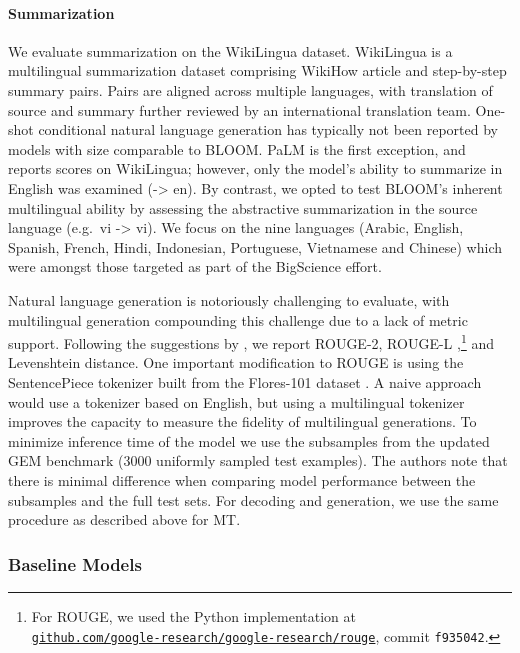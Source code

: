 \paragraph{Summarization} We evaluate summarization on the WikiLingua \citep{ladhak-etal-2020-wikilingua} dataset. WikiLingua is a multilingual summarization dataset comprising WikiHow article and step-by-step summary pairs. Pairs are aligned across multiple languages, with translation of source and summary further reviewed by an international translation team. One-shot conditional natural language generation has typically not been reported by models with size comparable to BLOOM. PaLM \citep{chowdhery2022palm} is the first exception, and reports scores on WikiLingua; however, only the model's ability to summarize in English was examined (-> en). By contrast, we opted to test BLOOM's inherent multilingual ability by assessing the abstractive summarization in the source language (e.g.~vi -> vi). We focus on the nine languages (Arabic, English, Spanish, French, Hindi, Indonesian, Portuguese, Vietnamese and Chinese) which were amongst those targeted as part of the BigScience effort. 

Natural language generation is notoriously challenging to evaluate, with multilingual generation compounding this challenge due to a lack of metric support. Following the suggestions by \citet{gehrmann_cracked}, we report ROUGE-2, ROUGE-L \citep{lin-2004-rouge},\footnote{For ROUGE, we used the Python implementation at\\ \href{https://github.com/google-research/google-research/tree/master/rouge}{\texttt{github.com/google-research/google-research/rouge}}, commit \texttt{f935042}.} and Levenshtein distance. One important modification to ROUGE is using the SentencePiece tokenizer \citep{kudo-richardson-2018-sentencepiece} built from the Flores-101 dataset \citep{goyal-etal-2022-flores}. A naive approach would use a tokenizer based on English, but using a multilingual tokenizer improves the capacity to measure the fidelity of multilingual generations. To minimize inference time of the model we use the subsamples from the updated GEM benchmark \citep{gemv2} (3000 uniformly sampled test examples). The authors note that there is minimal difference when comparing model performance between the subsamples and the full test sets. For decoding and generation, we use the same procedure as described above for MT.

\subsubsection{Baseline Models}

